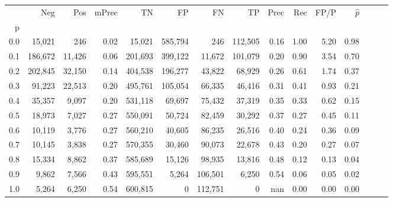 \begin{tabular}{rrrrrrrrrrrrrrr}
\toprule
{} &      Neg &     Pos & mPrec &       TN &       FP &       FN &       TP &  Prec &   Rec &  FP/P & $\hat{p}$ \\
p   &          &         &       &          &          &          &          &       &       &       &           \\
\midrule
0.0 &   15,021 &     246 &  0.02 &   15,021 &  585,794 &      246 &  112,505 &  0.16 &  1.00 &  5.20 &      0.98 \\
0.1 &  186,672 &  11,426 &  0.06 &  201,693 &  399,122 &   11,672 &  101,079 &  0.20 &  0.90 &  3.54 &      0.70 \\
0.2 &  202,845 &  32,150 &  0.14 &  404,538 &  196,277 &   43,822 &   68,929 &  0.26 &  0.61 &  1.74 &      0.37 \\
0.3 &   91,223 &  22,513 &  0.20 &  495,761 &  105,054 &   66,335 &   46,416 &  0.31 &  0.41 &  0.93 &      0.21 \\
0.4 &   35,357 &   9,097 &  0.20 &  531,118 &   69,697 &   75,432 &   37,319 &  0.35 &  0.33 &  0.62 &      0.15 \\
0.5 &   18,973 &   7,027 &  0.27 &  550,091 &   50,724 &   82,459 &   30,292 &  0.37 &  0.27 &  0.45 &      0.11 \\
0.6 &   10,119 &   3,776 &  0.27 &  560,210 &   40,605 &   86,235 &   26,516 &  0.40 &  0.24 &  0.36 &      0.09 \\
0.7 &   10,145 &   3,838 &  0.27 &  570,355 &   30,460 &   90,073 &   22,678 &  0.43 &  0.20 &  0.27 &      0.07 \\
0.8 &   15,334 &   8,862 &  0.37 &  585,689 &   15,126 &   98,935 &   13,816 &  0.48 &  0.12 &  0.13 &      0.04 \\
0.9 &    9,862 &   7,566 &  0.43 &  595,551 &    5,264 &  106,501 &    6,250 &  0.54 &  0.06 &  0.05 &      0.02 \\
1.0 &    5,264 &   6,250 &  0.54 &  600,815 &        0 &  112,751 &        0 &   nan &  0.00 &  0.00 &      0.00 \\
\bottomrule
\end{tabular}
